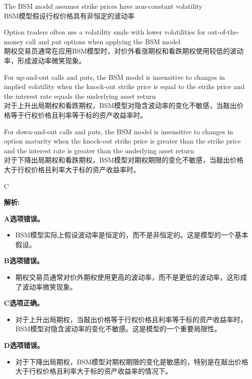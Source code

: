 \documentclass{article}
\newenvironment{explanation}
{\textbf{解析:}\par}
{\par}
\begin{document}
\begin{choices}
    \item The BSM model assumes strike prices have non-constant volatility
    \\ BSM模型假设行权价格具有非恒定的波动率
    \item Option traders often use a volatility smile with lower volatilities for out-of-the-money call and put options when applying the BSM model
    \\ 期权交易员通常在应用BSM模型时，对价外看涨期权和看跌期权使用较低的波动率，形成波动率微笑现象。
    \item For up-and-out calls and puts, the BSM model is insensitive to changes in implied volatility when the knock-out strike price is equal to the strike price and the interest rate equals the underlying asset return
    \\ 对于上升出局期权和看跌期权，BSM模型对隐含波动率的变化不敏感，当敲出价格等于行权价格且利率等于标的资产收益率时。
    \item For down-and-out calls and puts, the BSM model is insensitive to changes in option maturity when the knock-out strike price is greater than the strike price and the interest rate is greater than the underlying asset return
    \\ 对于下降出局期权和看跌期权，BSM模型对期权期限的变化不敏感，当敲出价格大于行权价格且利率大于标的资产收益率时。
\end{choices}

\begin{correctanswer}
    C
\end{correctanswer}

\begin{explanation}
    \textbf{A选项错误。}
    \begin{itemize}
        \item BSM模型实际上假设波动率是恒定的，而不是非恒定的。这是模型的一个基本假设。
    \end{itemize}
    
    \textbf{B选项错误。}
    \begin{itemize}
        \item 期权交易员通常对价外期权使用更高的波动率，而不是更低的波动率，这形成了波动率微笑现象。
    \end{itemize}
    
    \textbf{C选项正确。}
    \begin{itemize}
        \item 对于上升出局期权，当敲出价格等于行权价格且利率等于标的资产收益率时，BSM模型对隐含波动率的变化不敏感。这是模型的一个重要局限性。
    \end{itemize}
    
    \textbf{D选项错误。}
    \begin{itemize}
        \item 对于下降出局期权，BSM模型对期权期限的变化是敏感的，特别是在敲出价格大于行权价格且利率大于标的资产收益率的情况下。
    \end{itemize}
\end{explanation}
\end{document}
